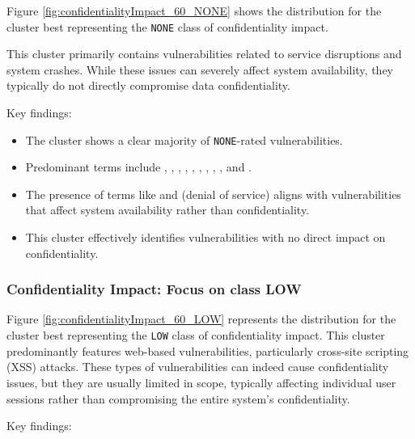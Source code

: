 \documentclass[12pt]{article}
\begin{document}
Figure \ref{fig:confidentialityImpact_60_NONE} shows the distribution for the cluster best
representing the \texttt{NONE} class of confidentiality impact.

This cluster primarily contains vulnerabilities related to service disruptions and system crashes.
While these issues can severely affect system availability, they typically do not directly
compromise data confidentiality.

Key findings:

\begin{itemize}

	\item The cluster shows a clear majority of \texttt{NONE}-rated vulnerabilities.

	\item Predominant terms include , , , ,
	      , , , , , and .

	\item The presence of terms like  and  (denial of service) aligns with
	      vulnerabilities that affect system availability rather than confidentiality.

	\item This cluster effectively identifies vulnerabilities with no direct impact on
	      confidentiality.

\end{itemize}

\subsubsection{Confidentiality Impact: Focus on class LOW}

Figure \ref{fig:confidentialityImpact_60_LOW} represents the distribution for the cluster best
representing the \texttt{LOW} class of confidentiality impact. This cluster predominantly
features web-based vulnerabilities, particularly cross-site scripting (XSS) attacks. These types of
vulnerabilities can indeed cause confidentiality issues, but they are usually limited in scope,
typically affecting individual user sessions rather than compromising the entire system's
confidentiality.

Key findings:
\end{document}
